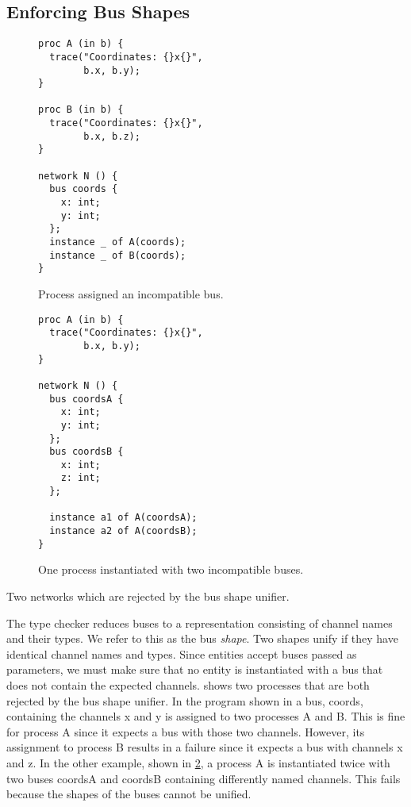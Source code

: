 \subsection{Enforcing Bus Shapes}
\begin{widefigure}
  \begin{subfigure}[t]{0.49\textwidth}
\begin{lstlisting}[language=smeil]
proc A (in b) {
  trace("Coordinates: {}x{}",
        b.x, b.y);
}

proc B (in b) {
  trace("Coordinates: {}x{}",
        b.x, b.z);
}

network N () {
  bus coords {
    x: int;
    y: int;
  };
  instance _ of A(coords);
  instance _ of B(coords);
}
\end{lstlisting}
    \caption{Process assigned an incompatible bus.}
    \label{fig:incom1}
   
  \end{subfigure}
\begin{subfigure}[t]{0.49\textwidth}  
\begin{lstlisting}[language=smeil]
proc A (in b) {
  trace("Coordinates: {}x{}",
        b.x, b.y);
}

network N () {
  bus coordsA {
    x: int;
    y: int;
  };
  bus coordsB {
    x: int;
    z: int;
  };

  instance a1 of A(coordsA);
  instance a2 of A(coordsB);
}
\end{lstlisting}
    \caption{One process instantiated with two incompatible buses.}
    \label{fig:incom2}
  \end{subfigure}
  \caption{Two networks which are rejected by the bus shape unifier.}
  \label{fig:busuni}
\end{widefigure}


The type checker reduces buses to a representation consisting of channel names
and their types. We refer to this as the bus {\itshape shape}. Two shapes unify if
they have identical channel names and types. Since entities accept buses passed
as parameters, we must make sure that no entity is instantiated with a bus that
does not contain the expected channels.  shows two processes
that are both rejected by the bus shape unifier. In the program shown in
 a bus, {\ttfamily coords}, containing the channels {\ttfamily x} and {\ttfamily
  y} is assigned to two processes {\ttfamily A} and {\ttfamily B}. This is fine for process
{\ttfamily A} since it expects a bus with those two channels. However, its assignment
to process {\ttfamily B} results in a failure since it expects a bus with channels
{\ttfamily x} and {\ttfamily z}. In the other example, shown in \cref{fig:incom2}, a process
{\ttfamily A} is instantiated twice with two buses {\ttfamily coordsA} and {\ttfamily coordsB}
containing differently named channels. This fails because the shapes of the
buses cannot be unified.

